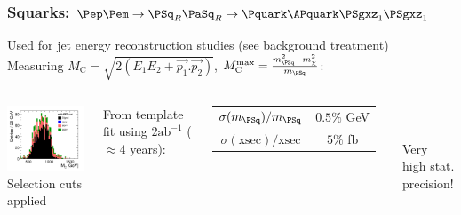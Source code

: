 \documentclass{beamer}
\begin{document}
\begin{frame}
\frametitle{Squarks: $\Pep\Pem \to \PSq_R\PaSq_R\to\Pquark\APquark\PSgxz_1\PSgxz_1$} 
Used for \alert{jet energy reconstruction} studies (see background treatment)\\
Measuring $M_{\textrm{C}} = \sqrt{2(E_1E_2+\vec{p_1}.\vec{p_2})}$,
$M_{\textrm{C}}^{\textrm{max}}=\frac{m_{\PSq}^2 - m_{\chi}^2}{m_{\PSq}}$:
\begin{columns}[c]
\column{6cm}
\begin{center}
\includegraphics[width=6cm]{BackgroundRejection_MCwithBDTCut.pdf}\\
Selection cuts applied
\end{center}
\column{6cm}
From template fit using $2\textrm{ab}^{-1}$ ($\approx4$ years):\\
\begin{tabular}{cc}
\toprule
$\sigma(m_{\PSq})/m_{\PSq}$ & $0.5\%$ GeV\\
$\sigma(\textrm{xsec})/\textrm{xsec}$ & $5\%$ fb\\
\bottomrule
\end{tabular}\\
~\\
\alert{Very high stat. precision!}
\end{columns}
\end{frame}
\end{document}
